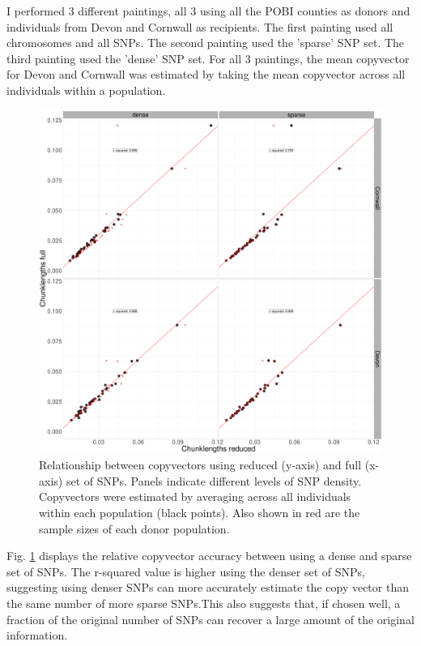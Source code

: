 I performed 3 different paintings, all 3 using all the POBI counties as donors and individuals from Devon and Cornwall as recipients. The first painting used all chromosomes and all SNPs. The second painting used the 'sparse' SNP set. The third painting used the 'dense' SNP set. For all 3 paintings, the mean copyvector for Devon and Cornwall was estimated by taking the mean copyvector across all individuals within a population. 

\begin{figure}[htp]
    \centering
    \includegraphics[width=1.0\textwidth]{../images/chapter1/dense_sparse_devon_cornwall_collapsed.pdf}
    \caption{Relationship between copyvectors using reduced (y-axis) and full (x-axis) set of SNPs. Panels indicate different levels of SNP density. Copyvectors were estimated by averaging across all individuals within each population (black points). Also shown in red are the sample sizes of each donor population.}
    \label{fig:dense_sparse_devon_cornwall_collapsed}
\end{figure}

Fig. \ref{fig:dense_sparse_devon_cornwall_collapsed} displays the relative copyvector accuracy between using a dense and sparse set of SNPs. The r-squared value is higher using the denser set of SNPs, suggesting using denser SNPs can more accurately estimate the copy vector than the same number of more sparse SNPs.This also suggests that, if chosen well, a fraction of the original number of SNPs can recover a large amount of the original information. 

